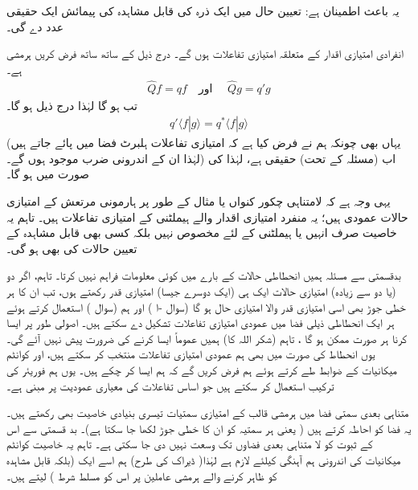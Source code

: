   یہ باعث اطمینان ہے:   تعیین حال میں ایک ذرہ کی  قابل مشاہدہ  کی پیمائش ایک حقیقی عدد دے گی۔ 
   
انفرادی امتیازی اقدار کے متعلقہ امتیازی تفاعلات  ہوں گے۔  
درج ذیل کے ساتھ ساتھ  فرض کریں     ہرمشی ہے۔
\begin{align*}
\hat{Q}f = qf  \quad \text{اور }\quad  \hat{Q}g=q'g
\end{align*}
  تب  ہو گا  لہٰذا  درج ذیل ہو گا۔
\begin{align*}
q' \langle f | g \rangle = q^{*} \langle f | g \rangle
\end{align*}
(یہاں بھی چونکہ ہم نے فرض کیا ہے کہ امتیازی تفاعلات   ہلبرٹ فضا  میں پائے جاتے ہیں لہٰذا  ان کے  اندرونی ضرب موجود ہوں  گے۔)   اب (مسئلہ  کے تحت)   حقیقی ہے،    لہٰذا    کی صورت میں    ہو گا۔  

یہی وجہ ہے کہ لامتناہی چکور کنواں یا مثال کے طور پر ہارمونی مرتعش کے امتیازی حالات عمودی ہیں؛   یہ منفرد امتیازی اقدار والے  ہیملٹنی کے امتیازی تفاعلات   ہیں۔  تاہم  یہ خاصیت صرف انہیں    یا  ہیملٹنی کے لئے  مخصوص  نہیں    بلکہ کسی بھی قابل مشاہدہ  کے تعیین  حالات کی بھی ہو گی۔

  بدقسمتی سے مسئلہ    ہمیں انحطاطی حالات  کے بارے میں کوئی معلومات فراہم نہیں کرتا۔  تاہم،  اگر دو (یا دو سے زیادہ)  امتیازی حالات ایک ہی (ایک دوسرے جیسا)  امتیازی قدر رکھتے ہوں،  تب ان کا  ہر خطی جوڑ  بھی اسی امتیازی قدر والا امتیازی حال ہو گا  (سوال -ا  )  اور ہم  (سوال )  استعمال کرتے ہوئے ہر ایک انحطاطی ذیلی فضا  میں عمودی امتیازی تفاعلات  تشکیل دے  سکتے ہیں۔  اصولی طور پر  ایسا کرنا ہر صورت  ممکن ہو گا ،  تاہم (شکر اللہ کا)  ہمیں عموماً    ایسا کرنے کی ضرورت پیش نہیں آئے گی۔  یوں انحطاط کی صورت  میں بھی ہم عمودی امتیازی تفاعلات  منتخب کر سکتے ہیں،   اور کوانٹم میکانیات کے ضوابط  طے کرتے ہوئے ہم فرض کریں گے  کہ ہم ایسا کر چکے ہیں۔  یوں ہم فوریئر کی ترکیب استعمال کر سکتے ہیں   جو   اساس تفاعلات   کی معیاری عمودیت پر مبنی ہے۔
  
     متناہی بعدی  سمتی  فضا  میں ہرمشی قالب کے امتیازی سمتیات   تیسری بنیادی خاصیت بھی رکھتے ہیں۔  یہ  فضا  کو احاطہ کرتے ہیں (  یعنی ہر سمتیہ کو ان کا خطی جوڑ لکھا جا سکتا ہے)۔  بد قسمتی سے اس کے  ثبوت کو  لا متناہی بعدی   فضاوں   تک وسعت  نہیں دی جا سکتی  ہے۔  تاہم یہ خاصیت کوانٹم میکانیات کی اندرونی ہم آہنگی کیلئے لازم ہے   لہٰذا(   ڈیراک کی طرح)  ہم اسے ایک    (بلکہ  قابل مشاہدہ کو ظاہر کرنے والے ہرمشی عاملین پر اس  کو مسلط شرط ) لیتے ہیں۔
     
